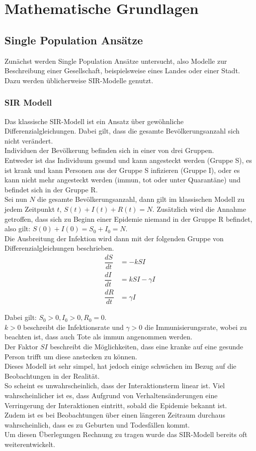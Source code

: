 \section{Mathematische Grundlagen}
\subsection{Single Population Ansätze}\label{ssec:spa}
\ellen
Zunächst werden Single Population Ansätze untersucht, also Modelle zur Beschreibung einer Gesellschaft, beispielsweise eines Landes oder einer Stadt. Dazu werden üblicherweise SIR-Modelle genutzt.

\subsubsection{SIR Modell}

Das klassische SIR-Modell ist ein Ansatz über gewöhnliche Differenzialgleichungen. Dabei gilt, dass die gesamte Bevölkerungsanzahl sich nicht verändert.\\
Individuen der Bevölkerung befinden sich in einer von drei Gruppen.\\
Entweder ist das Individuum gesund und kann angesteckt werden (Gruppe S), es ist krank und kann Personen aus der Gruppe S infizieren (Gruppe I), oder es kann nicht mehr angesteckt werden (immun, tot oder unter Quarantäne) und befindet sich in der Gruppe R.\\
Sei nun $N$ die gesamte Bevölkerungsanzahl, dann gilt im klassischen Modell zu jedem Zeitpunkt $t$, $S(t)+I(t)+R(t) = N$. Zusätzlich wird die Annahme getroffen, dass sich zu Beginn einer Epidemie niemand in der Gruppe R befindet, also gilt: $S(0)+I(0)= S_0+I_0 = N$.\\
Die Ausbreitung der Infektion wird dann mit der folgenden Gruppe von Differenzialgleichungen beschrieben.
\begin{align}
\dfrac{dS}{dt} &= -kSI\\
\dfrac{dI}{dt} &= kSI- \gamma I\\
\dfrac{dR}{dt} &= \gamma I
\end{align}

Dabei gilt: $S_0 > 0, I_0 > 0, R_0 = 0$.\\
$k > 0$ beschreibt die Infektionsrate und $\gamma > 0$ die Immunisierungsrate, wobei zu beachten ist, dass auch Tote als immun angenommen werden. \\
Der Faktor $SI$ beschreibt die Möglichkeiten, dass eine kranke auf eine gesunde Person trifft um diese anstecken zu können.\\  
Dieses Modell ist sehr simpel, hat jedoch einige schwächen im Bezug auf die Beobachtungen in der Realität.\\
So scheint es unwahrscheinlich, dass der Interaktionsterm linear ist. Viel wahrscheinlicher ist es, dass Aufgrund von Verhaltensänderungen eine Verringerung der Interaktionen eintritt, sobald die Epidemie bekannt ist.\\
Zudem ist es bei Beobachtungen über einen längeren Zeitraum durchaus wahrscheinlich, dass es zu Geburten und Todesfällen kommt.\\
Um diesen Überlegungen Rechnung zu tragen wurde das SIR-Modell bereits oft weiterentwickelt.


